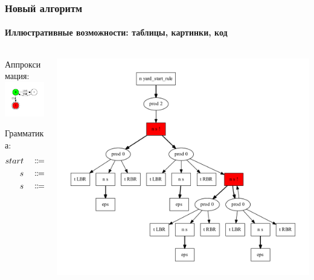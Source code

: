 \documentclass
  [ russian
  , aspectratio=1610 %
  ] {beamer}
\begin{document}
\begin{frame}%
    \frametitle{Новый алгоритм}
    \framesubtitle{Иллюстративные возможности: таблицы, картинки, код}
    \begin{columns}[T]
        \begin{column}[t]{.4\textwidth}
            \begin{minipage}{2in} \CodeExample         \end{minipage}
            Аппроксимация:\\
            \includegraphics[width=2.5cm]{figures/in3.pdf}

            Грамматика:
            {\begin{align*}
                start& & &\Coloneq & &s \\
                s & & &\Coloneq & &\mbox{\texttt{LBR }} s \mbox{\texttt{ RBR }} s \\
                s & & &\Coloneq & &\varepsilon
            \end{align*}}
        \end{column}
        \begin{column}[T]{.6\textwidth}
            \vspace{-2em}
            \includegraphics[width=1\textwidth]{figures/out3.pdf}
        \end{column}
    \end{columns}
\end{frame}
\end{document}
